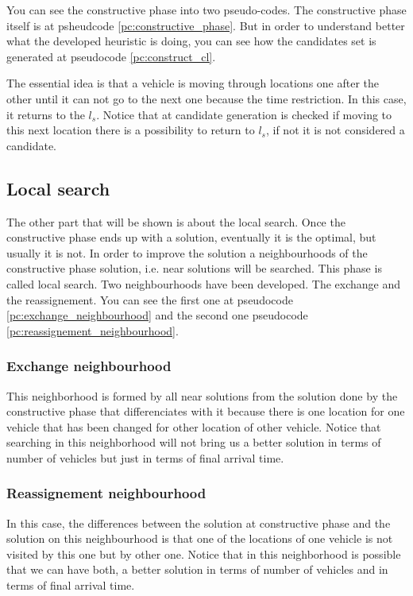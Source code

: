 \documentclass[]{report}
\begin{document}
You can see the constructive phase into two pseudo-codes. The constructive phase itself is at psheudcode \ref{pc:constructive_phase}. But in order to understand better what the developed heuristic is doing, you can see how the candidates set is generated at pseudocode \ref{pc:construct_cl}.

The essential idea is that a vehicle is moving through locations one after the other until it can not go to the next one because the time restriction. In this case, it returns to the $l_{s}$. Notice that at candidate generation is checked if moving to this next location there is a possibility to return to $l_{s}$, if not it is not considered a candidate.

\subsection{Local search}
The other part that will be shown is about the local search. Once the constructive phase ends up with a solution, eventually it is the optimal, but usually it is not. In order to improve the solution a neighbourhoods of the constructive phase solution, i.e. near solutions will be searched. This phase is called local search. Two neighbourhoods have been developed. The exchange and the reassignement. You can see the first one at pseudocode \ref{pc:exchange_neighbourhood} and the second one pseudocode \ref{pc:reassignement_neighbourhood}.

\subsubsection{Exchange neighbourhood}

This neighborhood is formed by all near solutions from the solution done by the constructive phase that differenciates with it because there is one location for one vehicle that has been changed for other location of other vehicle. Notice that searching in this neighborhood will not bring us a better solution in terms of number of vehicles but just in terms of final arrival time.

\subsubsection{Reassignement neighbourhood}

In this case, the differences between the solution at constructive phase and the solution on this neighbourhood is that one of the locations of one vehicle is not visited by this one but by other one. Notice that in this neighborhood is possible that we can have both, a better solution in terms of number of vehicles and in terms of final arrival time.
\end{document}
